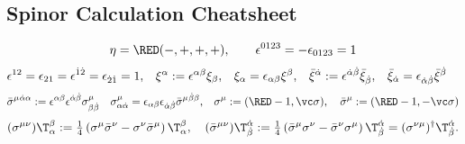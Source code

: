 \subsection{Spinor Calculation Cheatsheet}
\begin{preposition}{}\vspace{-.5zw}
\begin{align*}
 \eta = {\RED(-,+,+,+)},\qquad\epsilon^{0123}=-\epsilon_{0123} = 1
\end{align*}\vspace{-3zw}
\begin{align*}
  \epsilon^{12}=\epsilon_{21}=\epsilon^{\dot1\dot2}=\epsilon_{\dot2\dot1}&=1,&
\xi^\alpha&:=\epsilon^{\alpha\beta}\xi_\beta,& \xi_\alpha&=\epsilon_{\alpha\beta}\xi^\beta,&
\bar\xi^{\dot\alpha}&:=\epsilon^{{\dot\alpha}{\dot\beta}}\bar\xi_{\dot\beta},& \bar\xi_{\dot\alpha}&=\epsilon_{{\dot\alpha}{\dot\beta}}\bar\xi^{\dot\beta}
\end{align*}\vspace{-3zw}
\begin{align*}
  \bSm{}^{\dalpha\alpha} &:= \epsilon^{\alpha\beta}\epsilon^{\dalpha\dbeta}\Sm_{\beta\dbeta}&
 \Sm_{\alpha\dalpha}&= \epsilon_{\alpha\beta}\epsilon_{\dalpha\dbeta}\bSm{}^{\dbeta\beta},&
 \Sm:=({\RED-1},\vc\sigma),\quad\bSm:=({\RED-1},-\vc\sigma)
\end{align*}\vspace{-3zw}
\begin{align*}
  (\Smn)\T_\alpha^\beta:=\tfrac14\left(\Sm\bSn-\Sn\bSm\right)\T_{\alpha}^\beta,\quad
 (\bSmn)\T^\dalpha_\dbeta:=\tfrac14\left(\bSm\Sn-\bSn\Sm\right)\T^{\dalpha}_\dbeta =
(\Snm)^\dagger{}\T^\dalpha_\dbeta.
\end{align*}\vspace{-3zw}
\end{preposition}\vspace{-1.2zw}

